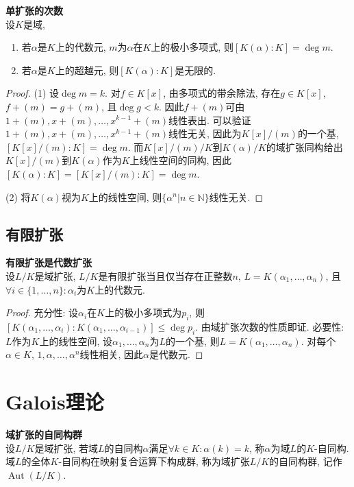 \begin{col}\textbf{单扩张的次数}\\
设$K$是域, 
\begin{enumerate}
\item 若$\alpha$是$K$上的代数元, $m$为$\alpha$在$K$上的极小多项式, 则$[K(\alpha):K]=\deg m$.
\item 若$\alpha$是$K$上的超越元, 则$[K(\alpha):K]$是无限的.
\end{enumerate} 
\end{col}
\begin{proof}
(1) 设$\deg m=k$. 对$f\in K[x]$, 由多项式的带余除法, 存在$g\in K[x]$, $f+(m)=g+(m)$, 且$\deg g<k$. 因此$f+(m)$可由$1+(m),x+(m),\dots,x^{k-1}+(m)$线性表出. 可以验证$1+(m),x+(m),\dots,x^{k-1}+(m)$线性无关, 因此为$K[x]/(m)$的一个基, $[K[x]/(m):K]=\deg m$. 而$K[x]/(m)/K$到$K(\alpha)/K$的域扩张同构给出$K[x]/(m)$到$K(\alpha)$作为$K$上线性空间的同构, 因此$[K(\alpha):K]=[K[x]/(m):K]=\deg m$.

(2) 将$K(\alpha)$视为$K$上的线性空间, 则$\{\alpha^n\vert n\in \mathbb{N}\}$线性无关. 
\end{proof}

\subsection{有限扩张}

\begin{pro}\textbf{有限扩张是代数扩张}\\
设$L/K$是域扩张, $L/K$是有限扩张当且仅当存在正整数$n$, $L=K(\alpha_1, \dots, \alpha_n)$, 且$\forall i\in \{1,\dots,n\}: \alpha_i$为$K$上的代数元.
\end{pro}
\begin{proof}
充分性: 设$\alpha_i$在$K$上的极小多项式为$p_i$, 则$[K(\alpha_1,\dots,\alpha_i): K(\alpha_1,\dots,\alpha_{i-1})]\le \deg p_i$. 由域扩张次数的性质即证. 必要性: $L$作为$K$上的线性空间, 设$\alpha_1,\dots,\alpha_n$为$L$的一个基, 则$L=K(\alpha_1,\dots,\alpha_n)$. 对每个$\alpha\in K$, $1,\alpha,\dots,\alpha^n$线性相关, 因此$\alpha$是代数元. 
\end{proof}

\section{Galois理论}

\begin{dfn}\textbf{域扩张的自同构群}\\
设$L/K$是域扩张, 若域$L$的自同构$\alpha$满足$\forall k\in K: \alpha(k)=k$, 称$\alpha$为域$L$的$K$-自同构. 域$L$的全体$K$-自同构在映射复合运算下构成群, 称为域扩张$L/K$的自同构群, 记作$\operatorname{Aut}(L/K)$. 
\end{dfn}

